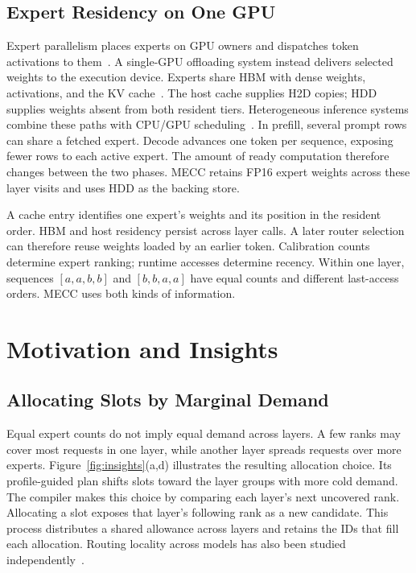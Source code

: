\documentclass[conference,9pt,letterpaper]{IEEEtran}
\begin{document}
\subsection{Expert Residency on One GPU}
Expert parallelism places experts on GPU owners and dispatches token activations to them~\cite{deepspeedmoe,tutel,megablocks,flashmoedist,harmoeny}. A single-GPU offloading system instead delivers selected weights to the execution device. Experts share HBM with dense weights, activations, and the KV cache~\cite{pagedattention,sglang}. The host cache supplies H2D copies; HDD supplies weights absent from both resident tiers. Heterogeneous inference systems combine these paths with CPU/GPU scheduling~\cite{flexgen,dsinference,zeroinfinity,llmflash,powerinfer}. In prefill, several prompt rows can share a fetched expert. Decode advances one token per sequence, exposing fewer rows to each active expert. The amount of ready computation therefore changes between the two phases. MECC retains FP16 expert weights across these layer visits and uses HDD as the backing store.

A cache entry identifies one expert's weights and its position in the resident order. HBM and host residency persist across layer calls. A later router selection can therefore reuse weights loaded by an earlier token. Calibration counts determine expert ranking; runtime accesses determine recency. Within one layer, sequences $[a,a,b,b]$ and $[b,b,a,a]$ have equal counts and different last-access orders. MECC uses both kinds of information.

\section{Motivation and Insights}
\label{sec:challenges}
\subsection{Allocating Slots by Marginal Demand}
Equal expert counts do not imply equal demand across layers. A few ranks may cover most requests in one layer, while another layer spreads requests over more experts. Figure~\ref{fig:insights}(a,d) illustrates the resulting allocation choice. Its profile-guided plan shifts slots toward the layer groups with more cold demand. The compiler makes this choice by comparing each layer's next uncovered rank. Allocating a slot exposes that layer's following rank as a new candidate. This process distributes a shared allowance across layers and retains the IDs that fill each allocation. Routing locality across models has also been studied independently~\cite{routingconsistency}.
\end{document}
